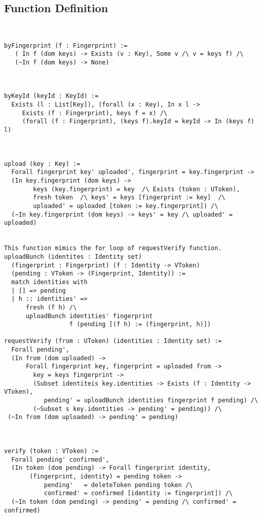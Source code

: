 \documentclass{article}
\begin{document}
\subsection{Function Definition}
\begin{verbatim}


byFingerprint (f : Fingerprint) := 
   ( In f (dom keys) -> Exists (v : Key), Some v /\ v = keys f) /\ 
   (~In f (dom keys) -> None) 
 


byKeyId (keyId : KeyId) :=
  Exists (l : List[Key]), (forall (x : Key), In x l -> 
     Exists (f : Fingerprint), keys f = x) /\
     (forall (f : Fingerprint), (keys f).keyId = keyId -> In (keys f) l)
      


upload (key : Key) := 
  Forall fingerprint key' uploaded', fingerprint = key.fingerprint -> 
  (In key.fingerprint (dom keys) -> 
        keys (key.fingerprint) = key  /\ Exists (token : UToken), 
        fresh token  /\ keys' = keys [fingerprint := key]  /\
        uploaded' = uploaded [token := key.fingerprint]) /\
  (~In key.fingerprint (dom keys) -> keys' = key /\ uploaded' = uploaded)  
         
              
This function mimics the for loop of requestVerify function.
uploadBunch (identites : Identity set) 
  (fingerprint : Fingerprint) (f : Identity -> VToken)  
  (pending : VToken -> (Fingerprint, Identity)) := 
  match identities with
  | [] => pending
  | h :: identities' => 
      fresh (f h) /\ 
      uploadBunch identities' fingerprint 
                  f (pending [(f h) := (fingerprint, h)])

requestVerify (from : UToken) (identities : Identity set) := 
  Forall pending',
  (In from (dom uploaded) -> 
      Forall fingerprint key, fingerprint = uploaded from -> 
        key = keys fingerprint -> 
        (Subset identiteis key.identities -> Exists (f : Identity -> VToken), 
           pending' = uploadBunch identities fingerprint f pending) /\
        (~Subset s key.identities -> pending' = pending)) /\
 (~In from (dom uploaded) -> pending' = pending)



verify (token : VToken) := 
  Forall pending' confirmed', 
  (In token (dom pending) -> Forall fingerprint identity,
       (fingerprint, identity) = pending token -> 
           pending'   = deleteToken pending token /\        
           confirmed' = confirmed [identity := fingerprint]) /\
  (~In token (dom pending) -> pending' = pending /\ confirmed' = confirmed)



\end{verbatim}
\end{document}
